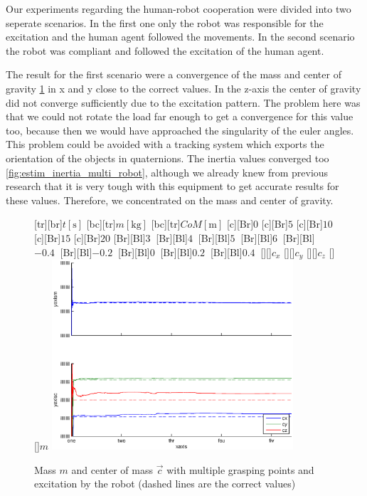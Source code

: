 Our experiments regarding the human-robot cooperation were divided into two seperate scenarios. In the first one only the robot was responsible for the excitation and the human agent followed the movements. In the second scenario the robot was compliant and followed the excitation of the human agent.

The result for the first scenario were a convergence of the mass and center of gravity \ref{fig:estim_mass_multi_robot} in x and y close to the correct values. In the z-axis the center of gravity did not converge sufficiently due to the excitation pattern. The problem here was that we could not rotate the load far enough to get a convergence for this value too, because then we would have approached the singularity of the euler angles. This problem could be avoided with a tracking system which exports the orientation of the objects in quaternions. The inertia values converged too \ref{fig:estim_inertia_multi_robot}, although we already knew from previous research that it is very tough with this equipment to get accurate results for these values. Therefore, we concentrated on the mass and center of gravity.

\begin{figure}
	\centering	
	[tr][br]{$t\left[\mathrm{s}\right]$}
	[bc][tr]{$m\left[\mathrm{kg}\right]$}
	[bc][tr]{$CoM\left[\mathrm{m}\right]$}
	[Br]{$0$}
	[Br]{$5$}
	[Br]{$10$}
	[Br]{$15$}
	[Br]{$20$}
	[Br][Bl]{$3\  $}
	[Br][Bl]{$4\ $}
	[Br][Bl]{$5\  $}
	[Br][Bl]{$6\  $}
	[Br][Bl]{$-0.4\  $}
	[Br][Bl]{$-0.2\ $}
	[Br][Bl]{$0\  $}
	[Br][Bl]{$0.2\  $}
	[Br][Bl]{$0.4\  $}
	[][]{\tiny $c_x$}
	[][]{\tiny $c_y$}
	[][]{\tiny $c_z$}
	[][]{\tiny $m$}
	\includegraphics[width=0.8\textwidth]{figures/multiple_grasping_points_robot_mass_and_cog.eps}
	\vspace{0.2cm}
	\caption[Mass error, multiple grasping points, excitation by robot]{Mass $m$ and center of mass $\vec{c}$ with multiple grasping points and excitation by the robot (dashed lines are the correct values)}
	\label{fig:estim_mass_multi_robot}
\end{figure}

